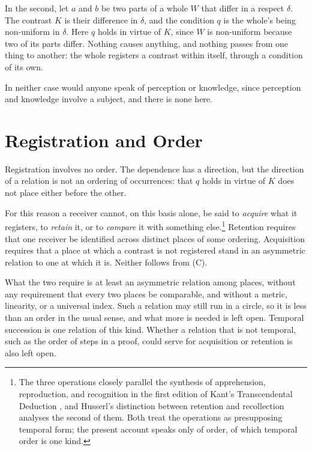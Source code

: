 \documentclass[11pt,a4paper,oneside]{scrartcl}
\begin{document}
In the second, let $a$ and $b$ be two parts of a whole $W$ that differ in a respect $\delta$. The
contrast $K$ is their difference in $\delta$, and the condition $q$ is the whole's being non-uniform
in $\delta$. Here $q$ holds in virtue of $K$, since $W$ is non-uniform because two of its parts
differ. Nothing causes anything, and nothing passes from one thing to another: the whole registers a
contrast within itself, through a condition of its own.

In neither case would anyone speak of perception or knowledge, since perception and knowledge
involve a subject, and there is none here.

\section{Registration and Order}\label{sec:order}

Registration involves no order. The dependence has a direction, but the direction of a relation is
not an ordering of occurrences: that $q$ holds in virtue of $K$ does not place either before the other.

For this reason a receiver cannot, on this basis alone, be said to \emph{acquire} what it
registers, to \emph{retain} it, or to \emph{compare} it with something else.\footnote{The three operations closely parallel the
synthesis of apprehension, reproduction, and recognition in the first edition of Kant's
Transcendental Deduction \autocite[A98--A110]{kant1998}, and Husserl's distinction between
retention and recollection \autocite{husserl1991} analyses the second of them. Both treat the
operations as presupposing temporal form; the present account speaks only of order, of which
temporal order is one kind.} Retention requires that one receiver be identified across distinct
places of some ordering. Acquisition requires that a place at which a contrast is not registered
stand in an asymmetric relation to one at which it is. Neither follows from (C).

What the two require is at least an asymmetric relation among places, without any requirement that
every two places be comparable, and without a metric, linearity, or a universal index. Such a
relation may still run in a circle, so it is less than an order in the usual sense, and what more
is needed is left open. Temporal succession is one relation of this kind. Whether a relation that is
not temporal, such as the order of steps in a proof, could serve for acquisition or retention is
also left open.
\end{document}
